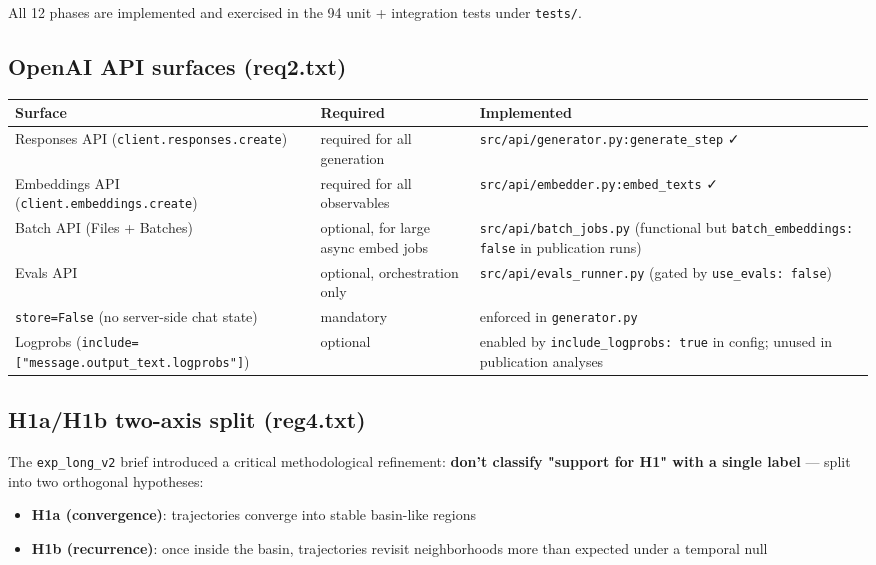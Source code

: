 \documentclass{article}
\theoremstyle{plain}
\theoremstyle{definition}
\begin{document}
All 12 phases are implemented and exercised in the 94 unit + integration
tests under \texttt{tests/}.

\subsection{OpenAI API surfaces (req2.txt)}

\begin{table}[h!]
\centering
\small
\begin{tabular}{lll}
\toprule
Surface & Required & Implemented \\
\midrule
Responses API (\texttt{client.responses.create}) & required for all generation & \texttt{src/api/generator.py:generate\_step} ✓ \\
Embeddings API (\texttt{client.embeddings.create}) & required for all observables & \texttt{src/api/embedder.py:embed\_texts} ✓ \\
Batch API (Files + Batches) & optional, for large async embed jobs & \texttt{src/api/batch\_jobs.py} (functional but \texttt{batch\_embeddings: false} in publication runs) \\
Evals API & optional, orchestration only & \texttt{src/api/evals\_runner.py} (gated by \texttt{use\_evals: false}) \\
\texttt{store=False} (no server-side chat state) & mandatory & enforced in \texttt{generator.py} \\
Logprobs (\texttt{include=["message.output\_text.logprobs"]}) & optional & enabled by \texttt{include\_logprobs: true} in config; unused in publication analyses \\
\bottomrule
\end{tabular}
\end{table}

\subsection{H1a/H1b two-axis split (reg4.txt)}

The \texttt{exp\_long\_v2} brief introduced a critical methodological refinement:
\textbf{don't classify "support for H1" with a single label} — split into
two orthogonal hypotheses:

\begin{itemize}
  \item \textbf{H1a (convergence)}: trajectories converge into stable
  basin-like regions
  \item \textbf{H1b (recurrence)}: once inside the basin, trajectories revisit
  neighborhoods more than expected under a temporal null
\end{itemize}
\end{document}
